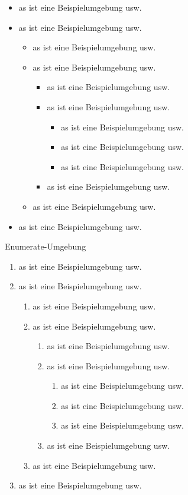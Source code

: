 \begin{itemize}
\item as ist eine Beispielumgebung usw.
\item as ist eine Beispielumgebung usw.
\begin{itemize}
\item as ist eine Beispielumgebung usw.
\item as ist eine Beispielumgebung usw.
\begin{itemize}
\item as ist eine Beispielumgebung usw.
\item as ist eine Beispielumgebung usw.
\begin{itemize}
\item as ist eine Beispielumgebung usw.
\item as ist eine Beispielumgebung usw.
\item  as ist eine Beispielumgebung usw.
\end{itemize}
\item  as ist eine Beispielumgebung usw.
\end{itemize}
\item  as ist eine Beispielumgebung usw.
\end{itemize}
\item  as ist eine Beispielumgebung usw.
\end{itemize}

Enumerate-Umgebung

\begin{enumerate}
\item as ist eine Beispielumgebung usw.
\item as ist eine Beispielumgebung usw.
\begin{enumerate}
\item as ist eine Beispielumgebung usw.
\item as ist eine Beispielumgebung usw.
\begin{enumerate}
\item as ist eine Beispielumgebung usw.
\item as ist eine Beispielumgebung usw.
\begin{enumerate}
\item as ist eine Beispielumgebung usw.
\item as ist eine Beispielumgebung usw.
\item  as ist eine Beispielumgebung usw.
\end{enumerate}
\item  as ist eine Beispielumgebung usw.
\end{enumerate}
\item  as ist eine Beispielumgebung usw.
\end{enumerate}
\item  as ist eine Beispielumgebung usw.
\end{enumerate}


